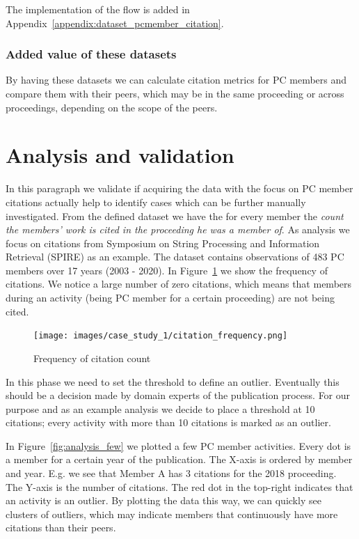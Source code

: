 \documentclass{ou-report}
\begin{document}

The implementation of the flow is added in 
Appendix~\ref{appendix:dataset_pcmember_citation}.

\subsubsection{Added value of these datasets}
By having these datasets we can calculate citation metrics for 
PC members and 
compare them with their peers, which may be in the same proceeding or across 
proceedings, depending on the scope of the peers.

\section{Analysis and validation}
\label{sec:cs1_analysis}

In this paragraph we validate if acquiring the data with the focus on PC member
citations actually help to identify cases which can be further manually 
investigated.
From the defined dataset we have the for every member the \emph{count the
members' work is cited in the proceeding he was a member of}. 
As analysis we focus on citations from Symposium on String Processing and
Information Retrieval (SPIRE) as an example. The dataset 
contains observations of 483 PC members over 17 years (2003 - 2020).
In Figure~\ref{fig:citation_frequency} we show the frequency of citations. We notice
a large number of zero citations, which means that members during an activity 
(being PC member for a certain proceeding) are not being cited.

\begin{figure}[ht]
    \centering
    \texttt{[image: images/case\_study\_1/citation\_frequency.png]}
    \caption{Frequency of citation count}
    \label{fig:citation_frequency}
\end{figure}

In this phase we need to set the threshold to define an outlier. Eventually
this should be a decision made by domain experts of the publication process.
For our purpose and as an example
analysis we decide to place a threshold at 10 citations; every activity with
more than 10 citations is marked as an outlier.

In Figure~\ref{fig:analysis_few} we plotted a few PC member activities. 
Every dot is a member for a certain year of the publication.
The X-axis is ordered by member and year. E.g. we see that 
Member A has 3 citations for the 2018 proceeding. The Y-axis is the number of 
citations. The red dot in the 
top-right indicates that an activity is an outlier. By plotting the data 
this way, we can quickly
see clusters of outliers, which may indicate members that continuously have 
more citations than their peers.
\end{document}
